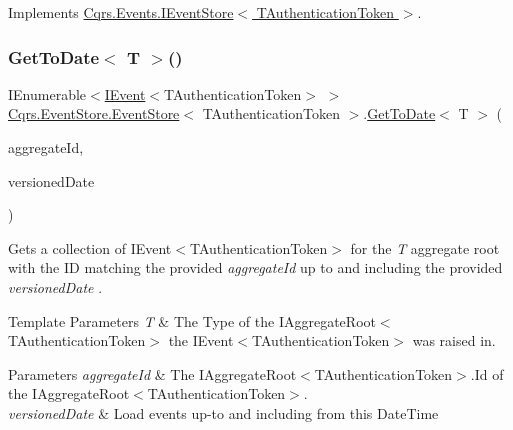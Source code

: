Implements \hyperlink{interfaceCqrs_1_1Events_1_1IEventStore_ae7a65fcb0881dbbd62ed86ccd7336712_ae7a65fcb0881dbbd62ed86ccd7336712}{Cqrs.\+Events.\+I\+Event\+Store$<$ T\+Authentication\+Token $>$}.

\mbox{\label{classCqrs_1_1EventStore_1_1EventStore_aaaa0b3c21d7ad3732af466dda82af5b9_aaaa0b3c21d7ad3732af466dda82af5b9}} 
\subsubsection{\texorpdfstring{Get\+To\+Date$<$ T $>$()}{GetToDate< T >()}}
{\footnotesize\ttfamily I\+Enumerable$<$\hyperlink{interfaceCqrs_1_1Events_1_1IEvent}{I\+Event}$<$T\+Authentication\+Token$>$ $>$ \hyperlink{classCqrs_1_1EventStore_1_1EventStore}{Cqrs.\+Event\+Store.\+Event\+Store}$<$ T\+Authentication\+Token $>$.\hyperlink{classCqrs_1_1EventStore_1_1EventStore_ac7208e6397e7f9145dfc03b27a2615b8_ac7208e6397e7f9145dfc03b27a2615b8}{Get\+To\+Date}$<$ T $>$ (\begin{DoxyParamCaption}\item[{Guid}]{aggregate\+Id,  }\item[{Date\+Time}]{versioned\+Date }\end{DoxyParamCaption})}



Gets a collection of I\+Event$<$\+T\+Authentication\+Token$>$ for the {\itshape T} aggregate root with the ID matching the provided {\itshape aggregate\+Id}  up to and including the provided {\itshape versioned\+Date} . 


\begin{DoxyTemplParams}{Template Parameters}
{\em T} & The Type of the I\+Aggregate\+Root$<$\+T\+Authentication\+Token$>$ the I\+Event$<$\+T\+Authentication\+Token$>$ was raised in.\\
\hline
\end{DoxyTemplParams}

\begin{DoxyParams}{Parameters}
{\em aggregate\+Id} & The I\+Aggregate\+Root$<$\+T\+Authentication\+Token$>$.\+Id of the I\+Aggregate\+Root$<$\+T\+Authentication\+Token$>$.\\
\hline
{\em versioned\+Date} & Load events up-\/to and including from this Date\+Time\\
\hline
\end{DoxyParams}


